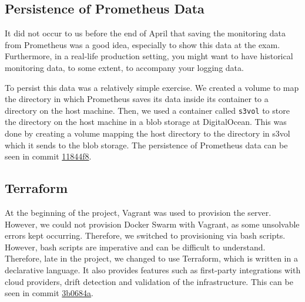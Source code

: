 \documentclass{article}
\begin{document}
\subsection{Persistence of Prometheus Data}

It did not occur to us before the end of April that saving the monitoring data from Prometheus was a good idea, especially to show this data at the exam. Furthermore, in a real-life production setting, you might want to have historical monitoring data, to some extent, to accompany your logging data.

To persist this data was a relatively simple exercise. We created a volume to map the directory in which Prometheus saves its data inside its container to a directory on the host machine. Then, we used a container called \texttt{s3vol} to store the directory on the host machine in a blob storage at DigitalOcean. This was done by creating a volume mapping the host directory to the directory in s3vol which it sends to the blob storage. The persistence of Prometheus data can be seen in commit \href{https://github.com/aske-w/itu-minitwit/commit/11844f8c0af04ecdc5992681cdda0c5ea357a6d8}{11844f8}.


\subsection{Terraform}
At the beginning of the project, Vagrant was used to provision the server. However, we could not provision Docker Swarm with Vagrant, as some unsolvable errors kept occurring. Therefore, we switched to provisioning via bash scripts. However, bash scripts are imperative and can be difficult to understand. Therefore, late in the project, we changed to use Terraform, which is written in a declarative language. It also provides features such as first-party integrations with cloud providers, drift detection and validation of the infrastructure. This can be seen in commit \href{https://github.com/aske-w/itu-minitwit/commit/3b0684ae4d10921b369ba92bf960bf13b54d7413}{3b0684a}.
\end{document}
